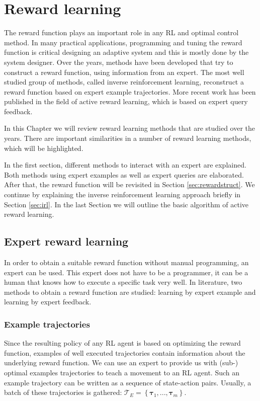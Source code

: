 \documentclass[mscThesis.tex]{subfiles}
\begin{document}
\chapter{Reward learning}
\label{chap:Reward}
The reward function plays an important role in any RL and optimal control method. In many practical applications, programming and tuning the reward function is critical designing an adaptive system and this is mostly done by the system designer. Over the years, methods have been developed that try to construct a reward function, using information from an expert. The most well studied group of methods, called inverse reinforcement learning, reconstruct a reward function based on expert example trajectories. More recent work has been published in the field of active reward learning, which is based on expert query feedback.

In this Chapter we will review reward learning methods that are studied over the years. There are important similarities in a number of reward learning methods, which will be highlighted. 

In the first section, different methods to interact with an expert are explained. Both methods using expert examples as well as expert queries are elaborated. After that, the reward function will be revisited in Section \ref{sec:rewardstruct}. We continue by explaining the inverse reinforcement learning approach briefly in Section \ref{sec:irl}. In the last Section we will outline the basic algorithm of active reward learning.

\section{Expert reward learning}
\label{sec:expert}
In order to obtain a suitable reward function without manual programming, an expert can be used. This expert does not have to be a programmer, it can be a human that knows how to execute a specific task very well. In literature, two methods to obtain a reward function are studied: learning by expert example and learning by expert feedback. 

\subsection{Example trajectories}
\label{ssec:example}
Since the resulting policy of any RL agent is based on optimizing the reward function, examples of well executed trajectories contain information about the underlying reward function. We can use an expert to provide us with (sub-) optimal examples trajectories to teach a movement to an RL agent. Such an example trajectory can be written as a sequence of state-action pairs. Usually, a batch of these trajectories is gathered: $\mathcal{T}_E = \left\{ \bm{\tau}_1, ..., \bm{\tau}_m \right\}$.
\end{document}
